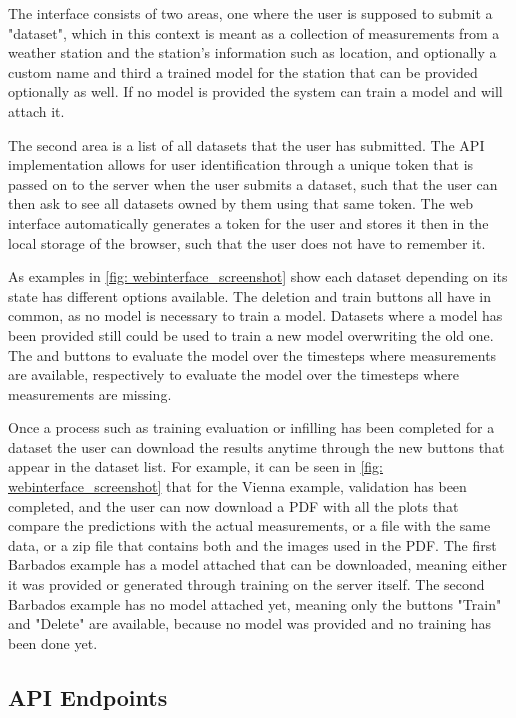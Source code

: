 The interface consists of two areas, one where the user is supposed to submit a "dataset", which in this context is meant as a collection of measurements from a weather station and the station's information such as location, and optionally a custom name and third a trained model for the station that can be provided optionally as well. If no model is provided the system can train a model and will attach it. 

The second area is a list of all datasets that the user has submitted. The API implementation allows for user identification through a unique token that is passed on to the server when the user submits a dataset, such that the user can then ask to see all datasets owned by them using that same token. The web interface automatically generates a token for the user and stores it then in the local storage of the browser, such that the user does not have to remember it.

As examples in \autoref{fig: webinterface_screenshot} show each dataset depending on its state has different options available. The deletion and train buttons all have in common, as no model is necessary to train a model. Datasets where a model has been provided still could be used to train a new model overwriting the old one. The  and  buttons to evaluate the model over the timesteps where measurements are available, respectively to evaluate the model over the timesteps where measurements are missing.

Once a process such as training evaluation or infilling has been completed for a dataset the user can download the results anytime through the new buttons that appear in the dataset list. For example, it can be seen in \autoref{fig: webinterface_screenshot} that for the Vienna example, validation has been completed, and the user can now download a PDF with all the plots that compare the predictions with the actual measurements, or a  file with the same data, or a zip file that contains both and the images used in the PDF. The first Barbados example has a model attached that can be downloaded, meaning either it was provided or generated through training on the server itself. The second Barbados example has no model attached yet, meaning only the buttons "Train" and "Delete" are available, because no model was provided and no training has been done yet. 


\subsection{API Endpoints}
\label{sec: api}

